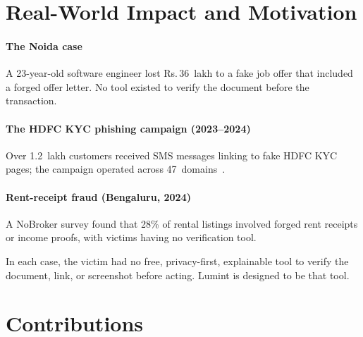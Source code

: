 \documentclass[conference]{IEEEtran}
\def\rupee{\textrm{Rs.\,}}
\begin{document}
\section{Real-World Impact and Motivation}

\paragraph{The Noida case} A 23-year-old software engineer lost
\rupee{}36~lakh to a fake job offer that included a forged offer
letter. No tool existed to verify the document before the transaction.

\paragraph{The HDFC KYC phishing campaign (2023--2024)} Over
1.2~lakh customers received SMS messages linking to fake HDFC KYC
pages; the campaign operated across 47~domains~\cite{certin2024}.

\paragraph{Rent-receipt fraud (Bengaluru, 2024)} A NoBroker survey
found that 28\% of rental listings involved forged rent receipts or
income proofs, with victims having no verification tool.

\vspace{2mm}

In each case, the victim had no free, privacy-first, explainable tool to
verify the document, link, or screenshot before acting. Lumint is
designed to be that tool.

\section{Contributions}
\end{document}
